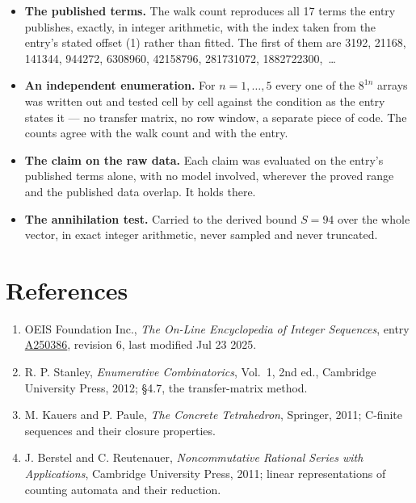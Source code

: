 \documentclass[11pt]{article}
\theoremstyle{definition}
\begin{document}
\begin{itemize}

\item {\bfseries The published terms.} The walk count reproduces all 17 terms the entry publishes, exactly, in integer arithmetic, with the index taken from the entry's stated offset (1) rather than fitted. The first of them are 3192, 21168, 141344, 944272, 6308960, 42158796, 281731072, 1882722300,~\dots

\item {\bfseries An independent enumeration.} For $n = 1,\dots,5$ every one of the $8^{1n}$ arrays was written out and tested cell by cell against the condition as the entry states it --- no transfer matrix, no row window, a separate piece of code. The counts agree with the walk count and with the entry.

\item {\bfseries The claim on the raw data.} Each claim was evaluated on the entry's published terms alone, with no model involved, wherever the proved range and the published data overlap. It holds there.

\item {\bfseries The annihilation test.} Carried to the derived bound $S = 94$ over the whole vector, in exact integer arithmetic, never sampled and never truncated.

\end{itemize}

\section{References}

\begin{enumerate}

\item OEIS Foundation Inc., \emph{The On-Line Encyclopedia of Integer Sequences}, entry \href{https://oeis.org/A250386}{A250386}, revision 6, last modified Jul 23 2025.

\item R. P. Stanley, \emph{Enumerative Combinatorics}, Vol.~1, 2nd ed., Cambridge University Press, 2012; \S4.7, the transfer-matrix method.

\item M. Kauers and P. Paule, \emph{The Concrete Tetrahedron}, Springer, 2011; C-finite sequences and their closure properties.

\item J. Berstel and C. Reutenauer, \emph{Noncommutative Rational Series with Applications}, Cambridge University Press, 2011; linear representations of counting automata and their reduction.

\end{enumerate}
\end{document}
